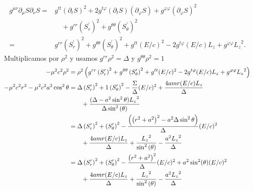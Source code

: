\begin{equation}
    \begin{aligned}
        g^{\mu \nu} \partial_\mu S \partial_\nu S= & g^{t t}\left(\partial_t S\right)^2+2 g^{t \varphi}\left(\partial_t S\right)\left(\partial_{\varphi} S\right)+g^{\varphi \varphi}\left(\partial_{\varphi} S\right)^2 \\
                                                   & \quad +g^{r r}\left(S_r^{\prime}\right)^2+g^{\theta \theta}\left(S_\theta^{\prime}\right)^2                                                                         \\
        =                                          & g^{r r}\left(S_r^{\prime}\right)^2+g^{\theta \theta}\left(S_\theta^{\prime}\right)^2 +g^{t t} (E/c)^2-2 g^{t \varphi} (E/c) {L_z}+g^{\varphi \varphi} {L_z}^2.
    \end{aligned}
\end{equation}
Multiplicamos por $\rho^2$ y usamos $g^{r r} \rho^2=\Delta$ y $g^{\theta \theta} \rho^2=1$
\begin{equation}
    \begin{aligned}
        -\mu^2 c^2 \rho^2                           & =\rho^2 \left(g^{r r}\left(S_r^{\prime}\right)^2+g^{\theta \theta}\left(S_\theta^{\prime}\right)^2 +g^{t t} (E/c)^2-2 g^{t \varphi} (E/c) {L_z}+g^{\varphi \varphi} {L_z}^2\right) \\
        -\mu^2 c^2 r^2-\mu^2 c^2 a^2 \cos ^2 \theta & = \Delta \left(S_r^{\prime}\right)^2+1\left(S_\theta^{\prime}\right)^2  - \frac{\Sigma}{\Delta}(E/c)^2+\frac{4 a m r (E/c){L_z}}{\Delta }                                              \\
                                                    & \qquad+ \frac{ (\Delta-a^2 \sin ^2 \theta){L_z}^2 }{\Delta  \sin^{2}{\left(\theta \right)}}                                                                                          \\
                                                    & = \Delta \left(S_r^{\prime}\right)^2+\left(S_\theta^{\prime}\right)^2  - \frac{\left(\left(r^2+a^2\right)^2-a^2 \Delta \sin ^2 \theta \right)}{\Delta}(E/c)^2                        \\
                                                    & \qquad+\frac{4 a m r (E/c){L_z}}{\Delta }  + \frac{{L_z}^2}{\sin^{2}{\left(\theta \right)}} - \frac{a^2 {L_z}^2}{\Delta}                                                                 \\
                                                    & = \Delta \left(S_r^{\prime}\right)^2+\left(S_\theta^{\prime}\right)^2  - \frac{\left(r^2+a^2\right)^2}{\Delta}(E/c)^2 +a^2  \sin ^2 (\theta)(E/c)^2                                  \\
                                                    & \qquad+\frac{4 a m r (E/c){L_z}}{\Delta }  + \frac{{L_z}^2}{\sin^{2}{\left(\theta \right)}} - \frac{a^2 {L_z}^2}{\Delta}                                                                 \\
    \end{aligned}
\end{equation}
